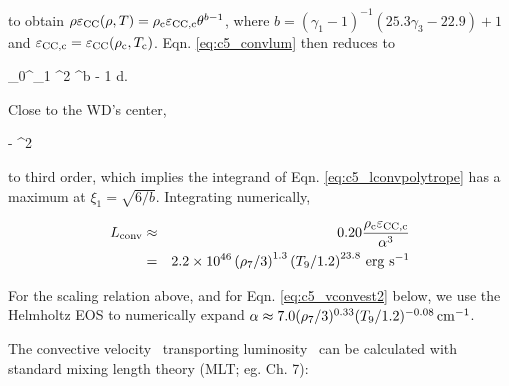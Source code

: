 \noindent to obtain $\rho\epscc(\rho, T) = \rhoc\epscentral\theta^{b - 1}$, where $b = (\gamma_1 - 1)^{-1}(25.3\gamma_3 - 22.9) + 1$ and $\epscentral = \epscc(\rhoc, \Tc)$.  Eqn. \ref{eq:c5_convlum} then reduces to

\eqbegin
\Lconv {}\pi\rhoc\epscentral{}\int_0^{\xi_1} \xi^2 \theta^{b - 1} d\xi.
\label{eq:c5_lconvpolytrope}
\eqend

\noindent Close to the WD's center, 

\eqbegin
\theta {} - \xi^2
\label{eq:c5_theta_approx}
\eqend

\noindent to third order, which implies the integrand of Eqn. \ref{eq:c5_lconvpolytrope} has a maximum at $\xi_1 = \sqrt{6/b}$.  Integrating numerically,







\begin{eqnarray}
\Lconv &\approx& 0.20\frac{\rhoc\epscentral}{\alpha^3}  \nonumber \\
&=& 2.2\times10^{46}\left(\rho_7/3\right)^{1.3}\left(T_9/1.2\right)^{23.8}\,\mrm{erg}\,\,\mrm{s}^{-1}
\label{eq:c5_convlumred}
\end{eqnarray}

\noindent For the scaling relation above, and for Eqn. \ref{eq:c5_vconvest2} below, we use the Helmholtz EOS to numerically expand $\alpha \approx 7.0(\rho_7/3)^{0.33}(T_9/1.2)^{-0.08}\,\mathrm{cm}^{-1}$.


The convective velocity \vconv\ transporting luminosity \Lconv\ can be calculated with standard mixing length theory (MLT; eg. \citealt{kippww12} Ch. 7):

